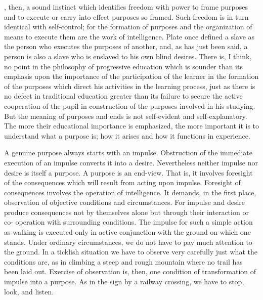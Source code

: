 , then, a sound instinct which identifies freedom with power to frame purposes 
and to execute or carry into effect purposes so framed. Such freedom is in turn identical 
with self-control; for the formation of purposes and the organization of means to execute 
them are the work of intelligence. Plate once defined a slave as the person who executes 
the purposes of another, and, as has just been said, a person is also a slave who is 
enslaved to his own blind desires. There is, I think, no point in the philosophy of 
progressive education which is sounder than its emphasis upon the importance of the 
participation of the learner in the formation of the purposes which direct his activities in 
the learning process, just as there is no defect in traditional education greater than its 
failure to secure the active cooperation of the pupil in construction of the purposes 
involved in his studying. But the meaning of purposes and ends is not self-evident and 
self-explanatory. The more their educational importance is emphasized, the more 
important it is to understand what a purpose is; how it arises and how it functions in 
experience. 

A genuine purpose always starts with an impulse. Obstruction of the immediate 
execution of an impulse converts it into a desire. Nevertheless neither impulse nor desire 
is itself a purpose. A purpose is an end-view. That is, it involves foresight of the 
consequences which will result from acting upon impulse. Foresight of consequences 
involves the operation of intelligence. It demands, in the first place, observation of 
objective conditions and circumstances. For impulse and desire produce consequences 
not by themselves alone but through their interaction or co- operation with surrounding 
conditions. The impulse for such a simple action as walking is executed only in active 
conjunction with the ground on which one stands. Under ordinary circumstances, we do 
not have to pay much attention to the ground. In a ticklish situation we have to observe very carefully just what the conditions are, as in climbing a steep and rough mountain 
where no trail has been laid out. Exercise of observation is, then, one condition of 
transformation of impulse into a purpose. As in the sign by a railway crossing, we have to 
stop, look, and listen. 

